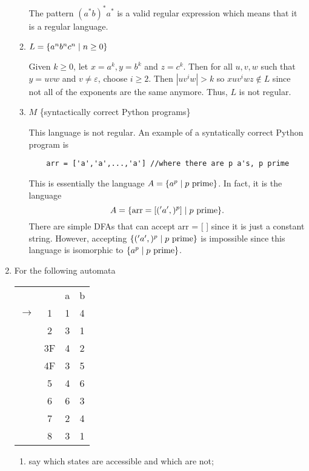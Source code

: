 \documentclass{article}
\newcommand{\setst}{\hspace{1mm} | \hspace{1mm} }
\renewcommand{\epsilon}{\varepsilon}
\theoremstyle{definition}
\begin{document}
\begin{enumerate}
\begin{enumerate}
	The pattern $(a^*b)^*a^*$ is a valid regular expression which means that it is a regular language. 
	\item $L = \{a^nb^nc^n \setst n \geq 0\}$
	
	Given $k \geq 0$, let $x = a^k, y = b^k$ and $z = c^k$. Then for all $u,v,w$ such that $y = uvw$ and $v \neq \epsilon$, choose $i \geq 2$. Then $|uv^iw| > k$ so $xuv^iwz \not\in L$ since not all of the exponents are the same anymore. Thus, $L$ is not regular. 
	\item $M$ \{syntactically correct Python programs\}
	
	This language is not regular. An example of a syntatically correct Python program is
	\begin{verbatim}
	arr = ['a','a',...,'a'] //where there are p a's, p prime
	\end{verbatim}
	This is essentially the language $A = \{a^p \setst p \text{ prime}\}$. In fact, it is the language 
	\[A = \{\text{arr} = [('a',)^p] \setst p \text{ prime}\}.\]
	There are simple DFAs that can accept arr = [ ] since it is just a constant string. However, accepting $\{('a',)^p \setst p \text{ prime}\}$ is impossible since this language is isomorphic to $\{a^p \setst p \text{ prime}\}$.
\end{enumerate}
\item[HW 4.3] For the following automata
\begin{center}
	\begin{tabular}{cccc}
		& & a & b \\\cline{3-4}
		$\rightarrow$ & \multicolumn{1}{c|}{1} &1 & 4\\
		& \multicolumn{1}{c|}{2} & 3 & 1\\
		& \multicolumn{1}{c|}{3F} & 4 & 2\\
		& \multicolumn{1}{c|}{4F} & 3 & 5\\
		& \multicolumn{1}{c|}{5} & 4 & 6\\
		& \multicolumn{1}{c|}{6} & 6 & 3\\
		& \multicolumn{1}{c|}{7} & 2 & 4\\
		& \multicolumn{1}{c|}{8} & 3 & 1\\
	\end{tabular}
\end{center}
\begin{enumerate}
	\item say which states are accessible and which are not;
	

\end{enumerate}
\end{enumerate}
\end{document}
